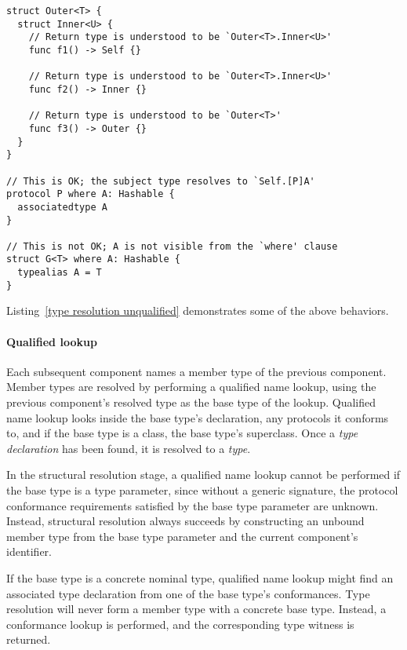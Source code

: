 \documentclass[a4paper,headsepline,bibliography=totoc,toc=flat,fleqn,twoside=semi]{scrbook}
\theoremstyle{definition}
\theoremstyle{definition}
\theoremstyle{definition}
\begin{document}
\begin{listing}\label{type resolution unqualified}
\begin{Verbatim}
struct Outer<T> {
  struct Inner<U> {
    // Return type is understood to be `Outer<T>.Inner<U>'
    func f1() -> Self {}

    // Return type is understood to be `Outer<T>.Inner<U>'
    func f2() -> Inner {}

    // Return type is understood to be `Outer<T>'
    func f3() -> Outer {} 
  }
}

// This is OK; the subject type resolves to `Self.[P]A' 
protocol P where A: Hashable {
  associatedtype A
}

// This is not OK; A is not visible from the `where' clause
struct G<T> where A: Hashable {
  typealias A = T
}
\end{Verbatim}
\end{listing}
Listing~\ref{type resolution unqualified} demonstrates some of the above behaviors.

\paragraph{Qualified lookup} Each subsequent component names a member type of the previous component. Member types are resolved by performing a qualified name lookup, using the previous component's resolved type as the base type of the lookup. Qualified name lookup looks inside the base type's declaration, any protocols it conforms to, and if the base type is a class, the base type's superclass. Once a \emph{type declaration} has been found, it is resolved to a \emph{type}.

In the structural resolution stage, a qualified name lookup cannot be performed if the base type is a type parameter, since without a generic signature, the protocol conformance requirements satisfied by the base type parameter are unknown. Instead, structural resolution always succeeds by constructing an unbound member type from the base type parameter and the current component's identifier.

If the base type is a concrete nominal type, qualified name lookup might find an associated type declaration from one of the base type's conformances. Type resolution will never form a member type with a concrete base type. Instead, a conformance lookup is performed, and the corresponding type witness is returned.
\end{document}
